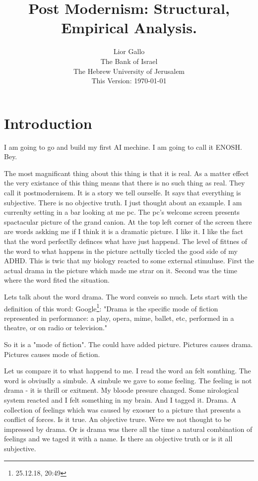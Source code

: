 \documentclass[14pt,oneside]{amsart}
\title{Post Modernism: Structural, Empirical Analysis.}
\author{Lior Gallo \\
The Bank of Israel \\
The Hebrew University of Jerusalem \\
This Version: \today }
\begin{document}
\maketitle
	\begin{abstract}

	\end{abstract}


\tableofcontents

\newpage

\section{Introduction}
I am going to go and build my first AI mechine. I am going to call it ENOSH. Bey.


The most magnificant thing about this thing is that it is real. As a matter effect the very existance of this thing means that there is no such thing as real. They call it postmodernisem. It is a story we tell ourselfe. It says that everything is subjective. There is no objective truth. I just thought about an example. I am currenlty setting in a bar looking at me pc. The pc's welcome screen presents spactacular picture of the grand canion. At the top left corner of the screen there are words askking me if I think it is a dramatic picture. I like it. I like the fact that the word perfectlly definces what have just happend. The level of fittnes of the word to what happens in the picture acttully ticcled the good side of my ADHD. This is twic that my biology reacted to some external stimuluse. First the actual drama in the picture which made me strar on it. Second was the time where the word fited the situation. 

Lets talk about the word drama. The word conveis so much. Lets start with the definition of this word:
Google\footnote{25.12.18, 20:49}: "Drama is the specific mode of fiction represented in performance: a play, opera, mime, ballet, etc, performed in a theatre, or on radio or television."

So it is a "mode of fiction". The could have added picture. Pictures causes drama. Pictures causes mode of fiction.

Let us compare it to what happend to me. I read the word an felt somthing. The word is obviuslly a simbule. A simbule we gave to some feeling. The feeling is not drama - it is thrill or exitment. My bloode presure changed. Some nirological system reacted and I felt something in my brain. And I tagged it. Drama. A collection of feelings which was caused by exosuer to a picture that presents a conflict of forces. Is it true. An objective trure. Were we not thought to be impressed by drama. Or is drama was there all the time a natural combination of feelings and we taged it with a name. Is there an objective truth or is it all subjective. 
\end{document}
